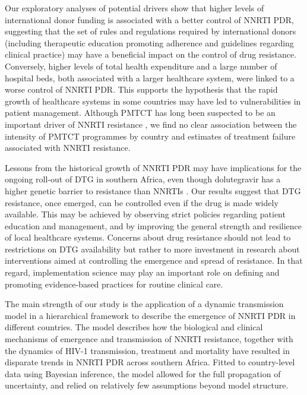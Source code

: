 \documentclass{article}
\begin{document}
Our exploratory analyses of potential drivers show that higher levels of international donor funding is associated with a better control of NNRTI PDR, suggesting that the set of rules and regulations required by international donors (including therapeutic education promoting adherence and guidelines regarding clinical practice) may have a beneficial impact on the control of drug resistance. Conversely, higher levels of total health expenditure and a large number of hospital beds, both associated with a larger healthcare system, were linked to a worse control of NNRTI PDR. This supports the hypothesis that the rapid growth of healthcare systems in some countries may have led to vulnerabilities in patient management. Although PMTCT has long been suspected to be an important driver of NNRTI resistance \cite{hamers2018hiv}, we find no clear association between the intensity of PMTCT programmes by country and estimates of treatment failure associated with NNRTI resistance.

Lessons from the historical growth of NNRTI PDR may have implications for the ongoing roll-out of DTG in southern Africa, even though dolutegravir has a higher genetic barrier to resistance than NNRTIs \cite{llibre2015genetic}. Our results suggest that DTG resistance, once emerged, can be controlled even if the drug is made widely available. This may be achieved by observing strict policies regarding patient education and management, and by improving the general strength and resilience of local healthcare systems. Concerns about drug resistance should not lead to restrictions on DTG availability but rather to more investment in research about interventions aimed at controlling the emergence and spread of resistance. In that regard, implementation science may play an important role on defining and promoting evidence-based practices for routine clinical care.

The main strength of our study is the application of a dynamic transmission model in a hierarchical framework to describe the emergence of NNRTI PDR in different countries. The model describes how the biological and clinical mechanisms of emergence and transmission of NNRTI resistance, together with the dynamics of HIV-1 transmission, treatment and mortality have resulted in disparate trends in NNRTI PDR across southern Africa. Fitted to country-level data using Bayesian inference, the model allowed for the full propagation of uncertainty, and relied on relatively few assumptions beyond model structure.
\end{document}
